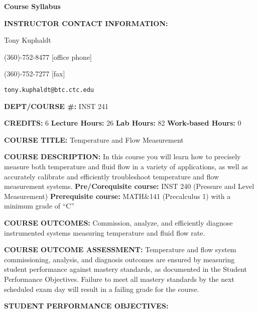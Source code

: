 


\centerline{\bf Course Syllabus} \bigskip 
 
\noindent
{\bf INSTRUCTOR CONTACT INFORMATION:}

Tony Kuphaldt

(360)-752-8477 [office phone]

(360)-752-7277 [fax]

{\tt tony.kuphaldt@btc.ctc.edu}

\vskip 10pt

\noindent
{\bf DEPT/COURSE \#:} INST 241

\vskip 10pt

\noindent
{\bf CREDITS:} 6 \hskip 30pt {\bf Lecture Hours:} 26 \hskip 30pt {\bf Lab Hours:} 82 \hskip 30pt {\bf Work-based Hours:} 0

\vskip 10pt

\noindent
{\bf COURSE TITLE:} Temperature and Flow Measurement

\vskip 10pt

\noindent
{\bf COURSE DESCRIPTION:} In this course you will learn how to precisely measure both temperature and fluid flow in a variety of applications, as well as accurately calibrate and efficiently troubleshoot temperature and flow measurement systems.   {\bf Pre/Corequisite course:} INST 240 (Pressure and Level Measurement) {\bf Prerequisite course:} MATH\&141 (Precalculus 1) with a minimum grade of ``C''

\vskip 10pt

\noindent
{\bf COURSE OUTCOMES:} Commission, analyze, and efficiently diagnose instrumented systems measuring temperature and fluid flow rate.

\vskip 10pt

\noindent
{\bf COURSE OUTCOME ASSESSMENT:} Temperature and flow system commissioning, analysis, and diagnosis outcomes are ensured by measuring student performance against mastery standards, as documented in the Student Performance Objectives.  Failure to meet all mastery standards by the next scheduled exam day will result in a failing grade for the course.


\vfil \eject

\noindent
{\bf STUDENT PERFORMANCE OBJECTIVES:}

